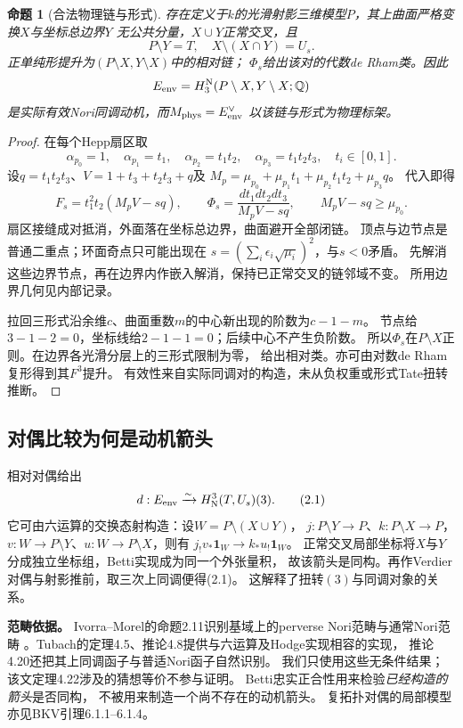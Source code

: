\documentclass[11pt,a4paper]{ctexart}
\theoremstyle{cnplain}\newtheorem{theorem}{定理}[section]
\newtheorem{proposition}[theorem]{命题}
\theoremstyle{remark}\newtheorem{remark}[theorem]{注}
\newcommand{\Q}{\mathbb Q}\newcommand{\C}{\mathbb C}\newcommand{\Z}{\mathbb Z}
\newcommand{\Nori}{\mathrm N}\newcommand{\im}{\operatorname{im}}
\begin{document}
\begin{proposition}[合法物理链与形式]\label{prop:pair}
存在定义于$k$的光滑射影三维模型$P$，其上曲面严格变换$X$与坐标总边界$Y$
无公共分量，$X\cup Y$正常交叉，且
\[
 P\setminus Y=T,\quad X\setminus(X\cap Y)=U_s.
\]
正单纯形提升为$(P\setminus X,Y\setminus X)$中的相对链；
$\Phi_s$给出该对的代数de Rham类。因此
\[
 E_{\rm env}=H_3^\Nori(P\setminus X,Y\setminus X;\Q)
\]
是实际有效Nori同调动机，而$M_{\rm phys}=E_{\rm env}^{\vee}$
以该链与形式为物理标架。
\end{proposition}
\begin{proof}
在每个Hepp扇区取
\[
 \alpha_{p_0}=1,\quad\alpha_{p_1}=t_1,\quad
 \alpha_{p_2}=t_1t_2,\quad\alpha_{p_3}=t_1t_2t_3,\quad t_i\in[0,1].
\]
设$q=t_1t_2t_3$、$V=1+t_3+t_2t_3+q$及
$M_p=\mu_{p_0}+\mu_{p_1}t_1+\mu_{p_2}t_1t_2+\mu_{p_3}q$。
代入即得
\[
 F_s=t_1^2t_2(M_pV-sq),\qquad
 \Phi_s=\frac{dt_1dt_2dt_3}{M_pV-sq},\qquad M_pV-sq\geq\mu_{p_0}.
\]
扇区接缝成对抵消，外面落在坐标总边界，曲面避开全部闭链。
顶点与边节点是普通二重点；环面奇点只可能出现在
$s=(\sum_i\epsilon_i\sqrt{\mu_i})^2$，与$s<0$矛盾。
先解消这些边界节点，再在边界内作嵌入解消，保持已正常交叉的链邻域不变。
所用边界几何见内部记录\cite{Geom,Hodge}。

拉回三形式沿余维$c$、曲面重数$m$的中心新出现的阶数为$c-1-m$。
节点给$3-1-2=0$，坐标线给$2-1-1=0$；后续中心不产生负阶数。
所以$\Phi_s$在$P\setminus X$正则。在边界各光滑分层上的三形式限制为零，
给出相对类。亦可由对数de Rham复形得到其$F^3$提升。
有效性来自实际同调对的构造，未从负权重或形式Tate扭转推断。
\end{proof}

\subsection{对偶比较为何是动机箭头}
相对对偶给出
\[
 d:E_{\rm env}\xrightarrow{\sim}H^3_\Nori(T,U_s)(3).                 \tag{2.1}
\]
它可由六运算的交换态射构造：设$W=P\setminus(X\cup Y)$，
$j:P\setminus Y\to P$、$k:P\setminus X\to P$，
$v:W\to P\setminus Y$、$u:W\to P\setminus X$，则有
$j_!v_*\mathbf1_W\to k_*u_!\mathbf1_W$。
正常交叉局部坐标将$X$与$Y$分成独立坐标组，Betti实现成为同一个外张量积，
故该箭头是同构。再作Verdier对偶与射影推前，取三次上同调便得(2.1)。
这解释了扭转$(3)$与同调对象的关系\cite{Kernel}。

\textbf{范畴依据。}
Ivorra--Morel的命题2.11识别基域上的perverse Nori范畴与通常Nori范畴
\cite{IM}。Tubach的定理4.5、推论4.8提供与六运算及Hodge实现相容的实现，
推论4.20还把其上同调函子与普适Nori函子自然识别\cite{Tubach}。
我们只使用这些无条件结果；该文定理4.22涉及的猜想等价不参与证明。
Betti忠实正合性用来检验\emph{已经构造的箭头}是否同构，
不被用来制造一个尚不存在的动机箭头。
复拓扑对偶的局部模型亦见BKV引理6.1.1--6.1.4\cite{BKV}。
\end{document}
